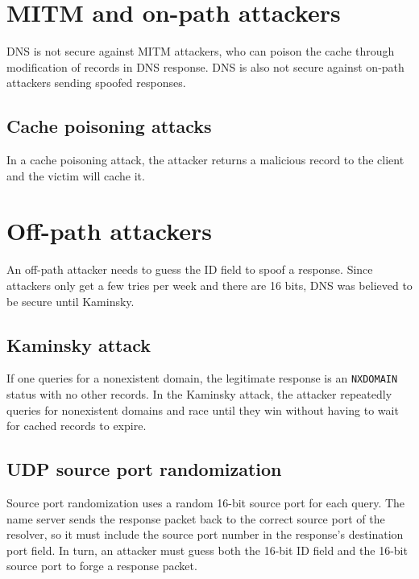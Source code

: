 \section{MITM and on-path attackers}
DNS is not secure against MITM attackers, who can poison the cache through modification of records in DNS response. DNS is also not secure against on-path attackers sending spoofed responses.

\subsection{Cache poisoning attacks}
In a cache poisoning attack, the attacker returns a malicious record to the client and the victim will cache it. 

\section{Off-path attackers}
An off-path attacker needs to guess the ID field to spoof a response. Since attackers only get a few tries per week and there are 16 bits, DNS was believed to be secure until Kaminsky.

\subsection{Kaminsky attack}
If one queries for a nonexistent domain, the legitimate response is an \texttt{NXDOMAIN} status with no other records. In the Kaminsky attack, the attacker repeatedly queries for nonexistent domains and race until they win without having to wait for cached records to expire.

\subsection{UDP source port randomization}
Source port randomization uses a random 16-bit source port for each query. The name server sends the response packet back to the correct source port of the resolver, so it must include the source port number in the response's destination port field. In turn, an attacker must guess both the 16-bit ID field and the 16-bit source port to forge a response packet.